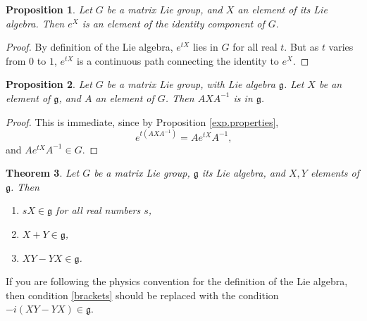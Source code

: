 \documentclass{amsbook}
\let \frak = \mathfrak
\theoremstyle{plain}
\newtheorem{theorem}{Theorem}
\newtheorem{proposition}[theorem]{Proposition}
\numberwithin{equation}{chapter}
\numberwithin{theorem}{chapter}
\begin{document}
\begin{proposition}
\label{identity}Let $G$ be a matrix Lie group, and $X$ an element of its Lie
algebra. Then $e^{X}$ is an element of the identity component of $G.$
\end{proposition}

\begin{proof}
By definition of the Lie algebra, $e^{tX}$ lies in $G$ for all real $t$. But
as $t$ varies from $0$ to $1$, $e^{tX}$ is a continuous path connecting the
identity to $e^{X}$.
\end{proof}

\begin{proposition}
\label{adjoint}Let $G$ be a matrix Lie group, with Lie algebra $\frak{g}$. Let
$X$ be an element of $\frak{g}$, and $A$ an element of $G$. Then $AXA^{-1}$ is
in $\frak{g}$.
\end{proposition}

\begin{proof}
This is immediate, since by Proposition \ref{exp.properties},
\[
e^{t(AXA^{-1})}=Ae^{tX}A^{-1}\text{,}%
\]
and $Ae^{tX}A^{-1}\in G$.
\end{proof}

\begin{theorem}
\label{lie.algebra.theorem}Let $G$ be a matrix Lie group, $\frak{g}$ its Lie
algebra, and $X,Y$ elements of $\frak{g}$. Then

\begin{enumerate}
\item \label{scalars}$sX\in\frak{g}$ for all real numbers $s$,

\item \label{sums}$X+Y\in\frak{g}$,

\item \label{brackets}$XY-YX\in\frak{g}$.
\end{enumerate}
\end{theorem}

If you are following the physics convention for the definition of the Lie
algebra, then condition \ref{brackets} should be replaced with the condition
$-i\left(  XY-YX\right)  \in\frak{g}$.
\end{document}
